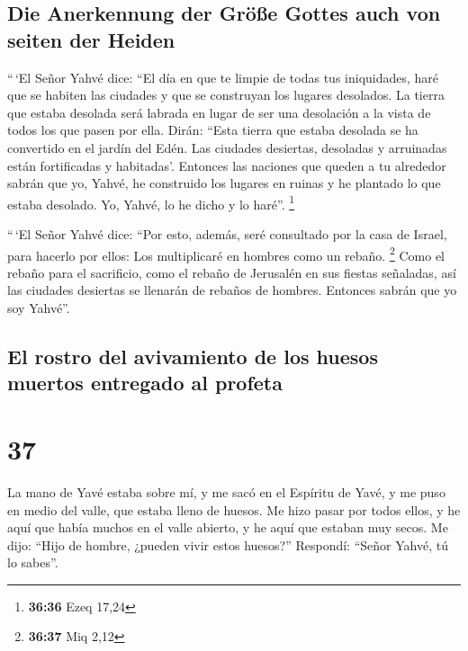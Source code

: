 \hypertarget{die-anerkennung-der-gruxf6uxdfe-gottes-auch-von-seiten-der-heiden}{%
\subsection{Die Anerkennung der Größe Gottes auch von seiten der
Heiden}\label{die-anerkennung-der-gruxf6uxdfe-gottes-auch-von-seiten-der-heiden}}

 ``\,`El Señor Yahvé dice: ``El día en que te limpie de
todas tus iniquidades, haré que se habiten las ciudades y que se
construyan los lugares desolados.  La tierra que estaba
desolada será labrada en lugar de ser una desolación a la vista de todos
los que pasen por ella.  Dirán: ``Esta tierra que estaba
desolada se ha convertido en el jardín del Edén. Las ciudades desiertas,
desoladas y arruinadas están fortificadas y habitadas'. 
Entonces las naciones que queden a tu alrededor sabrán que yo, Yahvé, he
construido los lugares en ruinas y he plantado lo que estaba desolado.
Yo, Yahvé, lo he dicho y lo haré''. \footnote{\textbf{36:36} Ezeq 17,24}

 ``\,`El Señor Yahvé dice: ``Por esto, además, seré
consultado por la casa de Israel, para hacerlo por ellos: Los
multiplicaré en hombres como un rebaño. \footnote{\textbf{36:37} Miq
  2,12}  Como el rebaño para el sacrificio, como el
rebaño de Jerusalén en sus fiestas señaladas, así las ciudades desiertas
se llenarán de rebaños de hombres. Entonces sabrán que yo soy Yahvé''.

\hypertarget{el-rostro-del-avivamiento-de-los-huesos-muertos-entregado-al-profeta}{%
\subsection{El rostro del avivamiento de los huesos muertos entregado al
profeta}\label{el-rostro-del-avivamiento-de-los-huesos-muertos-entregado-al-profeta}}

\hypertarget{section-36}{%
\section{37}\label{section-36}}

 La mano de Yavé estaba sobre mí, y me sacó en el Espíritu
de Yavé, y me puso en medio del valle, que estaba lleno de huesos.
 Me hizo pasar por todos ellos, y he aquí que había muchos
en el valle abierto, y he aquí que estaban muy secos.  Me
dijo: ``Hijo de hombre, ¿pueden vivir estos huesos?'' Respondí: ``Señor
Yahvé, tú lo sabes''.

